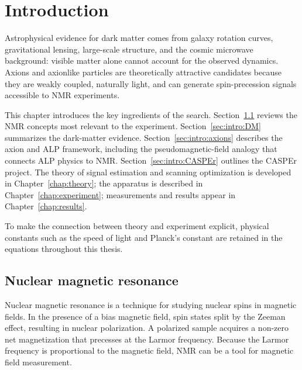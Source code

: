 \chapter{Introduction}\label{chap:introduction}


Astrophysical evidence for dark matter comes from galaxy rotation curves, gravitational lensing, large-scale structure, and the cosmic microwave background: visible matter alone cannot account for the observed dynamics.
Axions and axionlike particles are theoretically attractive candidates because they are weakly coupled, naturally light, and can generate spin-precession signals accessible to NMR experiments.

This chapter introduces the key ingredients of the search.
Section~\ref{sec:intro:NMR} reviews the NMR concepts most relevant to the experiment.
Section~\ref{sec:intro:DM} summarizes the dark-matter evidence.
Section~\ref{sec:intro:axions} describes the axion and ALP framework, including the pseudomagnetic-field analogy that connects ALP physics to NMR.
Section~\ref{sec:intro:CASPEr} outlines the CASPEr project.
The theory of signal estimation and scanning optimization is developed in Chapter~\ref{chap:theory}; the apparatus is described in Chapter~\ref{chap:experiment}; measurements and results appear in Chapter~\ref{chap:results}.

To make the connection between theory and experiment explicit, physical constants such as the speed of light and Planck's constant are retained in the equations throughout this thesis.

\section{Nuclear magnetic resonance}\label{sec:intro:NMR}
Nuclear magnetic resonance is a technique for studying nuclear spins in magnetic fields.
In the presence of a bias magnetic field, spin states split by the Zeeman effect, resulting in nuclear polarization.
A polarized sample acquires a non-zero net magnetization that precesses at the Larmor frequency.
Because the Larmor frequency is proportional to the magnetic field, NMR can be a tool for magnetic field measurement.

